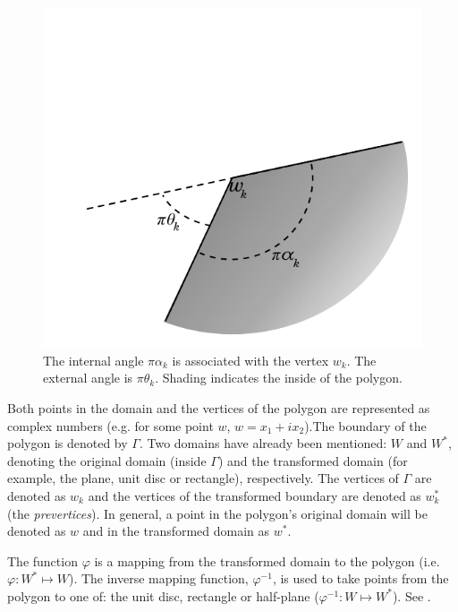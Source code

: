 \begin{figure} [t]
\centering
\includegraphics[scale=0.6]{sc/figs/anglediagram.pdf}
\caption{\label{cor-3s9}The internal angle $\pi\alpha_k$ is associated with the vertex $w_k$. The external angle is $\pi\theta_k$. Shading indicates the inside of the polygon.}
\label{anglediagram}
\end{figure}

\label{cor-r29-1}
Both points in the domain and the vertices of the polygon are represented as complex numbers (e.g. for some point $w$,  $w=x_1+ix_2$).The boundary of the polygon is denoted by $\Gamma$. Two domains have already been mentioned: $W$ and $W^*$, denoting the original domain (inside $\Gamma$) and the transformed domain (for example, the plane, unit disc or rectangle\label{cor-3s10}), respectively. The vertices of $\Gamma$ are denoted as $w_k$ and the vertices of the transformed boundary are denoted as $w^*_k$ (the \emph{prevertices}). In general, a point in the polygon's original domain will be denoted as $w$ and in the transformed domain as $w^*$. 

The function $\varphi$ is a mapping from the transformed domain to the polygon (i.e. $\varphi:W^* \mapsto W$). The inverse mapping function, $\varphi^{-1}$, is used to take points from the polygon to one of: the unit disc, rectangle or half-plane (\label{cor-3s11}$\varphi^{-1}:W \mapsto W^*$).  See .

